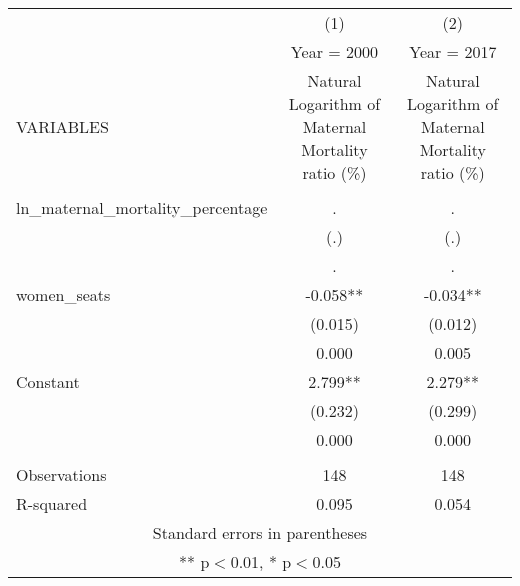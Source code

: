 \begin{tabular}{lcc} \hline
 & (1) & (2) \\
 & Year = 2000 & Year = 2017 \\
VARIABLES & Natural Logarithm of Maternal Mortality ratio (\%) & Natural Logarithm of Maternal Mortality ratio (\%) \\ \hline
 &  &  \\
ln\_maternal\_mortality\_percentage & . & . \\
 & (.) & (.) \\
 & . & . \\
women\_seats & -0.058** & -0.034** \\
 & (0.015) & (0.012) \\
 & 0.000 & 0.005 \\
Constant & 2.799** & 2.279** \\
 & (0.232) & (0.299) \\
 & 0.000 & 0.000 \\
 &  &  \\
Observations & 148 & 148 \\
 R-squared & 0.095 & 0.054 \\ \hline
\multicolumn{3}{c}{ Standard errors in parentheses} \\
\multicolumn{3}{c}{ ** p$<$0.01, * p$<$0.05} \\
\end{tabular}
